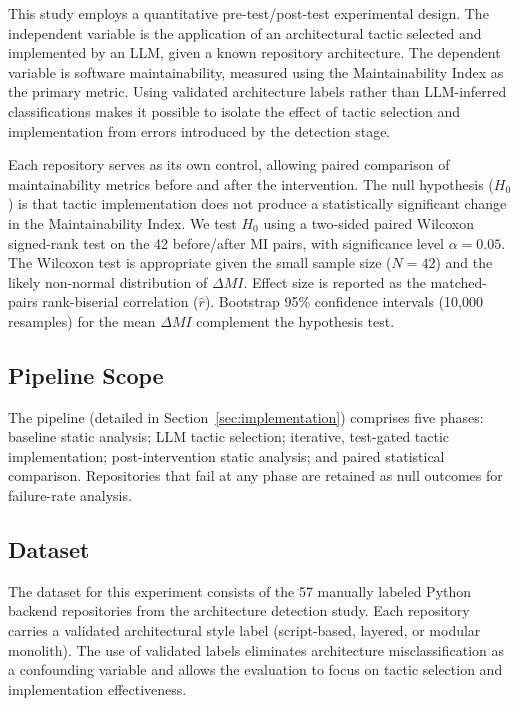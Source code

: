 \documentclass[runningheads]{llncs}
\begin{document}
This study employs a quantitative pre-test/post-test experimental design. The independent variable is the application of an architectural tactic selected and implemented by an LLM, given a known repository architecture. The dependent variable is software maintainability, measured using the Maintainability Index as the primary metric. Using validated architecture labels rather than LLM-inferred classifications makes it possible to isolate the effect of tactic selection and implementation from errors introduced by the detection stage.

Each repository serves as its own control, allowing paired comparison of maintainability metrics before and after the intervention. The null hypothesis ($H_0$) is that tactic implementation does not produce a statistically significant change in the Maintainability Index. We test $H_0$ using a two-sided paired Wilcoxon signed-rank test on the 42 before/after MI pairs, with significance level $\alpha = 0.05$. The Wilcoxon test is appropriate given the small sample size ($N = 42$) and the likely non-normal distribution of $\Delta MI$. Effect size is reported as the matched-pairs rank-biserial correlation ($\hat{r}$). Bootstrap 95\% confidence intervals (10,000 resamples) for the mean $\Delta MI$ complement the hypothesis test.

\subsection{Pipeline Scope}

The pipeline (detailed in Section~\ref{sec:implementation}) comprises five phases: baseline static analysis; LLM tactic selection; iterative, test-gated tactic implementation; post-intervention static analysis; and paired statistical comparison. Repositories that fail at any phase are retained as null outcomes for failure-rate analysis.

\subsection{Dataset}

The dataset for this experiment consists of the 57 manually labeled Python backend repositories from the architecture detection study. Each repository carries a validated architectural style label (script-based, layered, or modular monolith). The use of validated labels eliminates architecture misclassification as a confounding variable and allows the evaluation to focus on tactic selection and implementation effectiveness.
\end{document}
